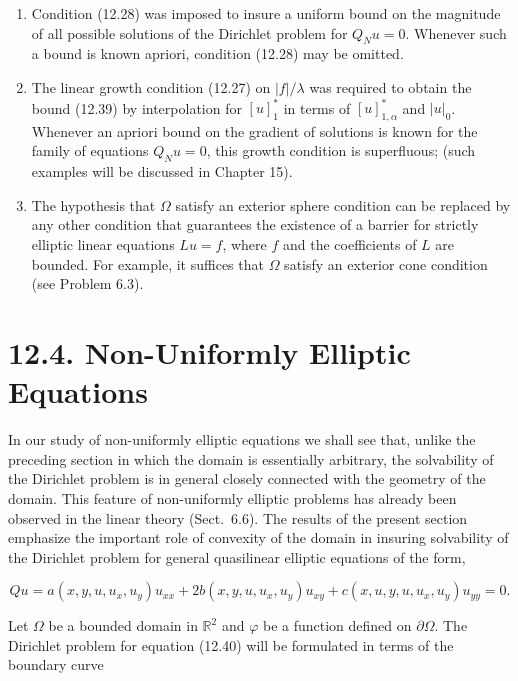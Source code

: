 \begin{enumerate}
\item[(2)] Condition (12.28) was imposed to insure a uniform bound on the magnitude of all possible solutions of the Dirichlet problem for $Q_Nu=0$. Whenever such a bound is known apriori, condition (12.28) may be omitted.

\item[(3)] The linear growth condition (12.27) on $|f|/\lambda$ was required to obtain the bound (12.39) by interpolation for $[u]_1^*$ in terms of $[u]_{1,\alpha}^*$ and $|u|_0$. Whenever an apriori bound on the gradient of solutions is known for the family of equations $Q_Nu=0$, this growth condition is superfluous; (such examples will be discussed in Chapter 15).

\item[(4)] The hypothesis that $\Omega$ satisfy an exterior sphere condition can be replaced by any other condition that guarantees the existence of a barrier for strictly elliptic linear equations $Lu=f$, where $f$ and the coefficients of $L$ are bounded. For example, it suffices that $\Omega$ satisfy an exterior cone condition (see Problem 6.3).
\end{enumerate}

\section*{12.4. Non-Uniformly Elliptic Equations}

In our study of non-uniformly elliptic equations we shall see that, unlike the preceding section in which the domain is essentially arbitrary, the solvability of the Dirichlet problem is in general closely connected with the geometry of the domain. This feature of non-uniformly elliptic problems has already been observed in the linear theory (Sect.\ 6.6). The results of the present section emphasize the important role of convexity of the domain in insuring solvability of the Dirichlet problem for general quasilinear elliptic equations of the form,

\begin{equation}
\tag{12.40}
Qu=a(x,y,u,u_x,u_y)u_{xx}+2b(x,y,u,u_x,u_y)u_{xy}+c(x,u,y,u,u_x,u_y)u_{yy}
=0.
\end{equation}

Let $\Omega$ be a bounded domain in $\mathbb{R}^2$ and $\varphi$ be a function defined on $\partial\Omega$. The Dirichlet problem for equation (12.40) will be formulated in terms of the boundary curve

